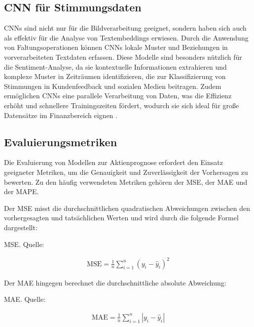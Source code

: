 \subsection{\acs{CNN} für Stimmungsdaten}

\acp{CNN} sind nicht nur für die Bildverarbeitung geeignet, sondern haben sich auch als effektiv für die Analyse von Textembeddings erwiesen. Durch die Anwendung von Faltungsoperationen können \acp{CNN} lokale Muster und Beziehungen in vorverarbeiteten Textdaten erfassen. Diese Modelle sind besonders nützlich für die Sentiment-Analyse, da sie kontextuelle Informationen extrahieren und komplexe Muster in Zeiträumen identifizieren, die zur Klassifizierung von Stimmungen in Kundenfeedback und sozialen Medien beitragen. Zudem ermöglichen \acp{CNN} eine parallele Verarbeitung von Daten, was die Effizienz erhöht und schnellere Trainingszeiten fördert, wodurch sie sich ideal für große Datensätze im Finanzbereich eignen \autocite{kim2014convolutional}\autocite{zhang2015sensitivity}.

\subsection{Evaluierungsmetriken}\label{sec:theorie_evalmetrics}

Die Evaluierung von Modellen zur Aktienprognose erfordert den Einsatz geeigneter Metriken, um die Genauigkeit und Zuverlässigkeit der Vorhersagen zu bewerten. Zu den häufig verwendeten Metriken gehören der \ac{MSE}, der \ac{MAE} und der \ac{MAPE}.

Der \ac{MSE} misst die durchschnittlichen quadratischen Abweichungen zwischen den vorhergesagten und tatsächlichen Werten und wird durch die folgende Formel dargestellt:

\begin{formel}[h]
	\caption{\ac{MSE}. Quelle: \autocite{wallach1989mse}}
	\label{frm:mse}
	\begin{align}
	\text{MSE} = \frac{1}{n} \sum_{i=1}^{n} (y_i - \hat{y}_i)^2
	\end{align}
\end{formel}

Der \ac{MAE} hingegen berechnet die durchschnittliche absolute Abweichung:

\begin{formel}[h]
	\caption{\ac{MAE}. Quelle: \autocite{willmott2005mae}}
	\label{frm:MAE}
	\begin{align}
	\text{MAE} = \frac{1}{n} \sum_{i=1}^{n} |y_i - \hat{y}_i|
	\end{align}
\end{formel}

